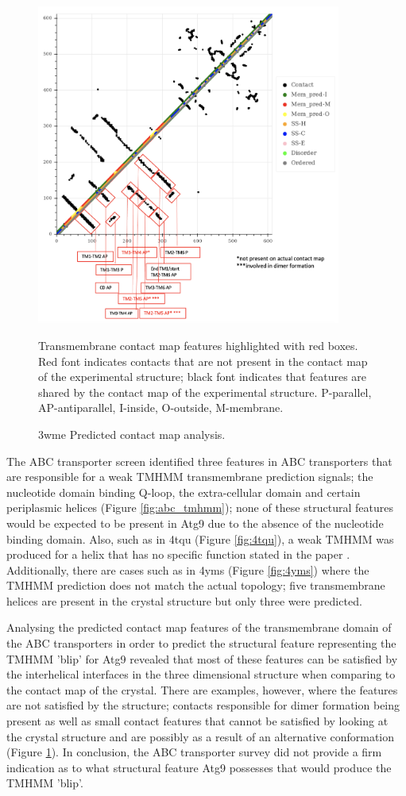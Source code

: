 \begin{figure}[th!]
    \centering
    \includegraphics[width=100mm, scale=1]{introduction/3wme_cmap.png}
    \caption{3wme Predicted contact map analysis.    }
    \label{fig:3wme Contact map analysis}
    \small
    Transmembrane contact map features highlighted with red boxes.  Red font indicates contacts that are not present in the contact map of the experimental structure; black font indicates that features are shared by the contact map of the experimental structure. P-parallel, AP-antiparallel, I-inside, O-outside, M-membrane. 
\end{figure}

 The ABC transporter screen identified three features in ABC transporters that are responsible for a weak TMHMM transmembrane prediction signals; the nucleotide domain binding Q-loop, the extra-cellular domain and certain periplasmic helices (Figure \ref{fig:abc_tmhmm}); none of these structural features would be expected to be present in Atg9 due to the absence of the nucleotide binding domain. Also, such as in 4tqu (Figure \ref{fig:4tqu}),  a weak TMHMM was produced for a helix that has no specific function stated in the paper \cite{maruyama2015structure}. Additionally, there are cases such as in 4yms (Figure \ref{fig:4yms}) where the TMHMM prediction does not match the actual topology; five transmembrane helices are present in the crystal structure but only three were predicted.
 
 Analysing the predicted contact map features of the transmembrane domain of the ABC transporters in order to predict the structural feature representing the TMHMM 'blip' for Atg9 revealed that most of these features can be satisfied by the interhelical interfaces in the three dimensional structure when comparing to the contact map of the crystal.  There are examples, however, where the features are not satisfied by the structure; contacts responsible for dimer formation being present as well as  small contact features that cannot be satisfied by looking at the crystal structure and are possibly as a result of an alternative conformation (Figure \ref{fig:3wme Contact map analysis}).  In conclusion, the ABC transporter survey did not provide a firm indication as to what structural feature Atg9 possesses that would produce the TMHMM 'blip'.
 
